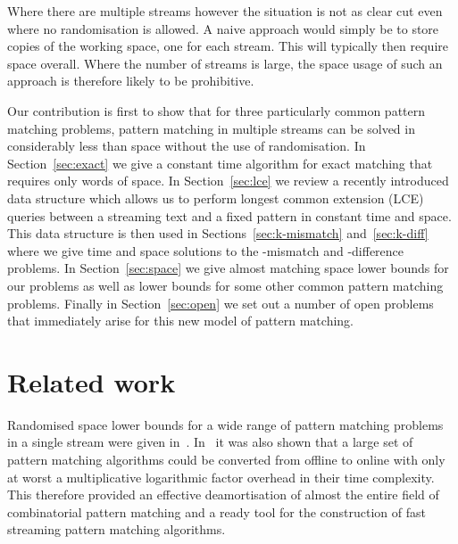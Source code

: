 \documentclass[envcountsame]{llncs}
\begin{document}
Where there are multiple streams however the situation is not as clear cut
even where no randomisation is allowed.  A naive approach would simply
be to store 
copies of the working space, one for each stream. This will typically then require 
space overall. Where the number of streams  is large, the space
usage of such an approach is therefore likely to be prohibitive.

Our contribution is first to show that for three particularly common pattern matching
problems, pattern matching in multiple streams can be solved in
considerably less than  space without the use of randomisation.
In Section~\ref{sec:exact} we give a constant time algorithm for exact matching that requires
only  words of space.
In Section~\ref{sec:lce} we review a recently introduced data structure which allows us to perform longest common extension (LCE) queries between a streaming text and a fixed pattern in constant time and  space.  This data structure is then used in Sections~\ref{sec:k-mismatch}
and~\ref{sec:k-diff}  where we give  time and  space solutions to the -mismatch and
-difference problems.  In Section~\ref{sec:space} we
give almost matching space lower bounds for our problems as well as lower bounds for some other common pattern matching problems. Finally in
Section~\ref{sec:open} we set out a number of open problems that immediately arise for this new model of pattern matching.






\section{Related work}

Randomised space lower bounds for a wide range of pattern matching
problems in a single stream were given in~\cite{CJPS:2011}.
In~\cite{CEPP:2011,CS:2011} it was also shown that a large set of
pattern matching algorithms could be converted from offline to online
with only at worst a multiplicative logarithmic factor overhead in
their time complexity. This therefore provided an effective
deamortisation of almost the entire field of combinatorial pattern
matching and a ready tool for the construction of fast streaming
pattern matching algorithms.
\end{document}
